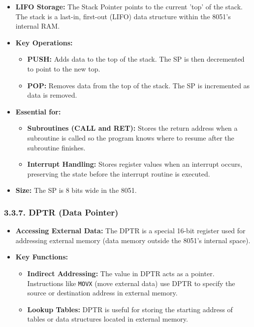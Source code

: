 \documentclass[
]{article}
\begin{document}
\begin{itemize}
\item
  \textbf{LIFO Storage:} The Stack Pointer points to the current 'top'
  of the stack. The stack is a last-in, first-out (LIFO) data structure
  within the 8051's internal RAM.
\item
  \textbf{Key Operations:}

  \begin{itemize}
  \item
    \textbf{PUSH:} Adds data to the top of the stack. The SP is then
    decremented to point to the new top.
  \item
    \textbf{POP:} Removes data from the top of the stack. The SP is
    incremented as data is removed.
  \end{itemize}
\item
  \textbf{Essential for:}

  \begin{itemize}
  \item
    \textbf{Subroutines (CALL and RET):} Stores the return address when
    a subroutine is called so the program knows where to resume after
    the subroutine finishes.
  \item
    \textbf{Interrupt Handling:} Stores register values when an
    interrupt occurs, preserving the state before the interrupt routine
    is executed.
  \end{itemize}
\item
  \textbf{Size:} The SP is 8 bits wide in the 8051.
\end{itemize}

\hypertarget{337-dptr-data-pointer}{%
\subsubsection{3.3.7. DPTR (Data Pointer)}\label{337-dptr-data-pointer}}

\begin{itemize}
\item
  \textbf{Accessing External Data:} The DPTR is a special 16-bit
  register used for addressing external memory (data memory outside the
  8051's internal space).
\item
  \textbf{Key Functions:}

  \begin{itemize}
  \item
    \textbf{Indirect Addressing:} The value in DPTR acts as a pointer.
    Instructions like \texttt{MOVX} (move external data) use DPTR to
    specify the source or destination address in external memory.
  \item
    \textbf{Lookup Tables:} DPTR is useful for storing the starting
    address of tables or data structures located in external memory.
  \end{itemize}
\end{itemize}
\end{document}
